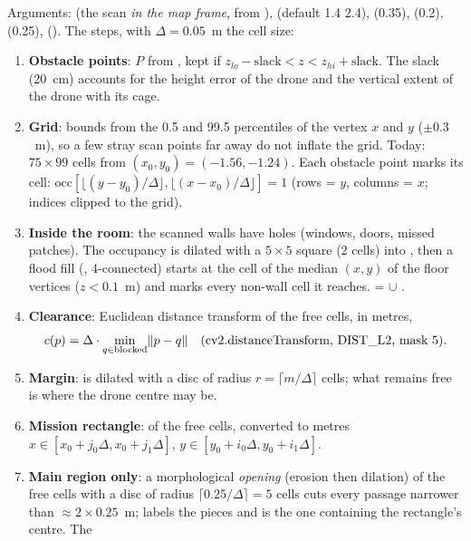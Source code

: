 Arguments:  (the scan \emph{in the map frame}, from ),  (default
1.4 2.4),  (0.35),  (0.2),  (0.25), 
(). The steps, with $\Delta = 0.05$~m the cell size:

\begin{enumerate}
\item \textbf{Obstacle points}: $P$ from , kept if
  $z_{lo} - \text{slack} < z < z_{hi} + \text{slack}$. The slack (20~cm) accounts for the height error of the
  drone and the vertical extent of the drone with its cage.
\item \textbf{Grid}: bounds from the 0.5 and 99.5 percentiles of the vertex $x$ and $y$ ($\pm 0.3$~m), so a few
  stray scan points far away do not inflate the grid. Today: $75 \times 99$ cells from $(x_0, y_0) = (-1.56,
  -1.24)$. Each obstacle point marks its cell: $\text{occ}[\lfloor (y - y_0)/\Delta\rfloor, \lfloor (x -
  x_0)/\Delta\rfloor] = 1$ (rows = $y$, columns = $x$; indices clipped to the grid).
\item \textbf{Inside the room}: the scanned walls have holes (windows, doors, missed patches). The occupancy is
  dilated with a $5\times5$ square (2 cells) into , then a flood fill (, 4-connected)
  starts at the cell of the median $(x, y)$ of the floor vertices ($z < 0.1$~m) and marks every non-wall cell it
  reaches.  =  $\cup$ .
\item \textbf{Clearance}: Euclidean distance transform of the free cells, in metres,
  \[
  c(p) = \Delta \cdot \min_{q \in \text{blocked}} \lVert p - q\rVert \quad (\text{cv2.distanceTransform, DIST\_L2, mask 5}).
  \]
\item \textbf{Margin}:  is dilated with a disc of radius $r = \lceil m/\Delta\rceil$ cells; what
  remains free is where the drone centre may be.
\item \textbf{Mission rectangle}:  of the free cells, converted to metres
  $x \in [x_0 + j_0\Delta, x_0 + j_1\Delta]$, $y \in [y_0 + i_0\Delta, y_0 + i_1\Delta]$.
\item \textbf{Main region only}: a morphological \emph{opening} (erosion then dilation) of the free cells with a
  disc of radius $\lceil 0.25/\Delta\rceil = 5$ cells cuts every passage narrower than $\approx 2 \times 0.25$~m;
   labels the pieces and  is the one containing the rectangle's centre. The

\end{enumerate}
